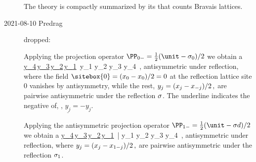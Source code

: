 \begin{description}
The theory is compactly summarized by its {\tzeta} 
that counts Bravais lattices.



\item[2021-08-10 Predrag]
dropped:

Applying the projection operator
\(
\PP_{{0}-} = \frac{1}{2} (\unit-\Refl_{0})/2
\)
we obtain
a {\lattstate}
\beq
\cdots
\underline{{y}_{4}}\,\underline{{y}_{3}}\,\underline{{y}_{2}}\,\underline{{y}_{1}}\,
      {y}_{1} {y}_{2} {y}_{3} {y}_{4}  \cdots
\,,
antisymmetric under reflection, where the
field
\(
\sitebox{0} =(\ssp_0-\ssp_0)/2 =0
\)
at the reflection lattice site $0$ vanishes by antisymmetry, while the rest,
\(
{y}_{j} =(x_{j}-x_{-j})/2
\,,
\)
are pairwise antisymmetric under the reflection $\sigma$. The underline
indicates the negative of, \ie, $\underline{{y}_{j}}=-{y}_{j}$.

Applying the antisymmetric projection operator
\(
\PP_{{1}-} = \frac{1}{2} (\unit-\Refl\shift)/2
\)
we obtain a {\lattstate}
\beq
\cdots
\underline{{y}_{4}}\,\underline{{y}_{3}}\,\underline{{y}_{2}}\,\underline{{y}_{1}}\,
        |
      {y}_{1} {y}_{2} {y}_{3} {y}_{4}  \cdots
\,,
antisymmetric under reflection, where
\(
{y}_{j} =(x_{j}-x_{1-j})/2
\,,
\)
are pairwise antisymmetric under the reflection $\sigma_{1}$.


\end{description}
